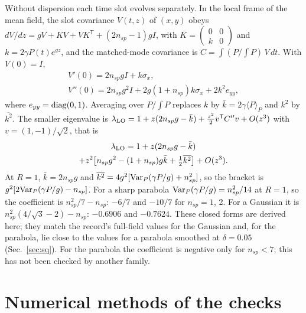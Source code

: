 \documentclass[aps,pra,twocolumn,superscriptaddress,nofootinbib,floatfix]{revtex4-2}
\newcommand{\nsp}{n_{sp}}
\newcommand{\lamLO}{\lambda_{\rm LO}}
\begin{document}
Without dispersion each time slot evolves separately. In the local frame of the mean field, the slot covariance $V(t,z)$
of $(x,y)$ obeys $dV/dz=gV+KV+VK^{\mathsf T}+(2\nsp-1)gI$, with $K=\begin{pmatrix}0&0\\k&0\end{pmatrix}$ and
$k=2\gamma P(t)e^{gz}$, and the matched-mode covariance is $C=\int(P/\!\int P)\,V\,dt$. With $V(0)=I$,
\begin{gather}
V'(0)=2\nsp gI+k\sigma_x,\\
V''(0)=2\nsp g^2I+2g(1+\nsp)k\sigma_x+2k^2e_{yy},
\end{gather}
where $e_{yy}={\rm diag}(0,1)$. Averaging over $P/\!\int P$ replaces $k$ by $\bar k=2\gamma\langle P\rangle_P$ and $k^2$ by
$\overline{k^2}$. The smaller eigenvalue is $\lamLO=1+z(2\nsp g-\bar k)+\frac{z^2}2v^{\mathsf T}C''v+O(z^3)$ with
$v=(1,-1)/\sqrt2$, that is
\begin{multline}
\lamLO=1+z(2\nsp g-\bar k)\\
+z^2\big[\nsp g^2-(1+\nsp)g\bar k+\tfrac12\overline{k^2}\big]+O(z^3).
\end{multline}
At $R=1$, $\bar k=2\nsp g$ and $\overline{k^2}=4g^2[{\rm Var}_P(\gamma P/g)+\nsp^2]$, so the bracket is
$g^2[2{\rm Var}_P(\gamma P/g)-\nsp]$. For a sharp parabola ${\rm Var}_P(\gamma P/g)=\nsp^2/14$ at $R=1$, so the
coefficient is $\nsp^2/7-\nsp$: $-6/7$ and $-10/7$ for $\nsp=1$, 2. For a Gaussian it is $\nsp^2(4/\sqrt3-2)-\nsp$:
$-0.6906$ and $-0.7624$. These closed forms are derived here; they match the record's full-field values for the
Gaussian and, for the parabola, lie close to the values for a parabola smoothed at $\delta=0.05$ (Sec.~\ref{sec:sq}). For the
parabola the coefficient is negative only for $\nsp<7$; this has not been checked by another family.

\section{Numerical methods of the checks}\label{app:methods}
\end{document}
